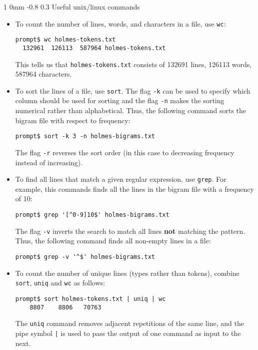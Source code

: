 \documentclass[11pt]{article}
\makeatletter
\newcommand{\newsec}[2]{\section{#1}\label{sec:#2}\noindent}
\renewcommand{\section}{\@startsection
{section}%
{1}%
{0mm}%
{-0.8\baselineskip}%
{0.3\baselineskip}%
{\bfseries\large}}%
\makeatother
\begin{document}
\appendix
\newsec{Useful unix/linux commands}{unix}%
\begin{itemize}
\item To count the number of lines, words, and characters in a file, use {\tt wc}:
\begin{verbatim}
prompt$ wc holmes-tokens.txt
  132961  126113  587964 holmes-tokens.txt
\end{verbatim}
This tells us that {\tt holmes-tokens.txt} consists of 132691 lines, 126113 words, 587964 characters. 

\item To sort the lines of a file, use {\tt sort}. The flag {\tt -k} can be used to specify which column should be used 
for sorting and the flag {\tt -n} makes the sorting numerical rather than alphabetical. 
Thus, the following command sorts the bigram file with respect to frequency:
\begin{verbatim}
prompt$ sort -k 3 -n holmes-bigrams.txt
\end{verbatim}
The flag {\tt -r} reverses the sort order (in this case to decreasing frequency instead of increasing).
\item To find all lines that match a given regular expression, use {\tt grep}. For example, this commands finds all the lines
in the bigram file with a frequency of 10:
\begin{verbatim}
prompt$ grep '[^0-9]10$' holmes-bigrams.txt
\end{verbatim}
The flag {\tt -v} inverts the search to match all lines \textbf{not} matching the pattern. Thus, the following command
finds all non-empty lines in a file:
\begin{verbatim}
prompt$ grep -v '^$' holmes-bigrams.txt
\end{verbatim}
\item To count the number of unique lines (types rather than tokens), combine {\tt sort}, {\tt uniq} and {\tt wc} as follows:
\begin{verbatim}
prompt$ sort holmes-tokens.txt | uniq | wc
    8807    8806   70763
\end{verbatim}
The {\tt uniq} command removes adjacent repetitions of the same line, and the pipe symbol {\tt |} is used to 
pass the output of one command as input to the next.
\end{itemize}
\end{document}

